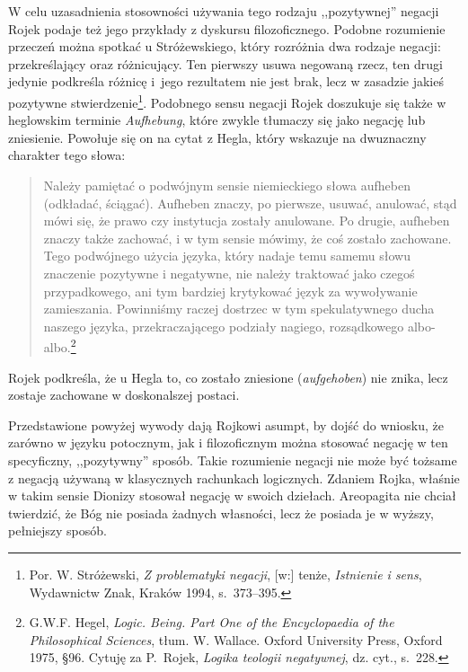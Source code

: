 W celu uzasadnienia stosowności używania tego rodzaju ,,pozytywnej''
negacji Rojek podaje też jego przykłady z dyskursu filozoficznego.
Podobne rozumienie przeczeń  można spotkać u Stróżewskiego, który
rozróżnia dwa rodzaje negacji: przekreślający oraz różnicujący. Ten
pierwszy usuwa negowaną rzecz, ten drugi jedynie podkreśla różnicę i~jego
rezultatem nie jest brak, lecz w zasadzie jakieś pozytywne
stwierdzenie\footnote{Por. W. Stróżewski, \textit{Z problematyki negacji}, [w:]
tenże, \textit{Istnienie i sens}, Wydawnictw Znak, Kraków 1994,
s.~373--395.}. Podobnego sensu negacji Rojek doszukuje się także
w heglowskim terminie \textit{Aufhebung}, które zwykle tłumaczy się
jako negację lub zniesienie. Powołuje się on na cytat z Hegla, który
wskazuje na dwuznaczny charakter tego słowa:

\begin{quote}
    Należy pamiętać o podwójnym sensie niemieckiego słowa aufheben
(odkładać, ściągać). Aufheben znaczy, po pierwsze, usuwać, anulować,
stąd mówi się, że prawo czy instytucja zostały anulowane. Po drugie,
aufheben znaczy także zachować, i w tym sensie mówimy, że coś zostało
zachowane. Tego podwójnego użycia języka, który nadaje temu samemu
słowu znaczenie pozytywne i negatywne, nie należy traktować jako czegoś
przypadkowego, ani tym bardziej krytykować język za wywoływanie
zamieszania. Powinniśmy raczej dostrzec w tym spekulatywnego ducha
naszego języka, przekraczającego podziały nagiego, rozsądkowego
albo-albo.\footnote{G.W.F. Hegel, \textit{Logic. Being. Part One of the
Encyclopaedia of the Philosophical Sciences}, tłum. W. Wallace. Oxford
University Press, Oxford 1975, §96. Cytuję za P.~Rojek, \textit{Logika teologii negatywnej}, dz. cyt.,
s.~228.}
\end{quote}
Rojek podkreśla, że u Hegla to, co zostało zniesione
(\textit{aufgehoben}) nie znika, lecz zostaje zachowane w doskonalszej
postaci.

Przedstawione powyżej wywody dają Rojkowi asumpt, by dojść do wniosku, że zarówno w języku
potocznym, jak i filozoficznym można stosować negację w ten
specyficzny, ,,pozytywny'' sposób. Takie rozumienie negacji nie może być
tożsame z negacją używaną w klasycznych rachunkach logicznych. Zdaniem
Rojka, właśnie w takim sensie Dionizy stosował negację w swoich
dziełach. Areopagita nie chciał twierdzić, że Bóg nie posiada żadnych
własności, lecz że posiada je w wyższy, pełniejszy sposób.

